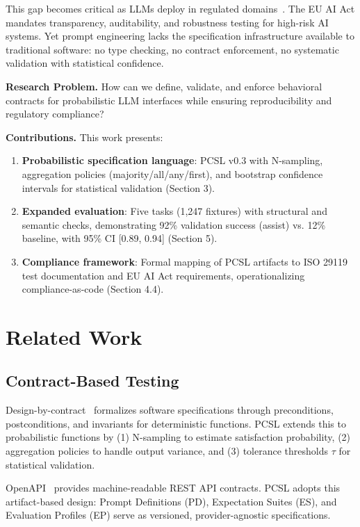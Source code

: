 \documentclass[sigconf]{acmart}
\begin{document}
This gap becomes critical as LLMs deploy in regulated domains~\cite{euaiact2024}. The EU AI Act mandates transparency, auditability, and robustness testing for high-risk AI systems. Yet prompt engineering lacks the specification infrastructure available to traditional software: no type checking, no contract enforcement, no systematic validation with statistical confidence.

\textbf{Research Problem.} How can we define, validate, and enforce behavioral contracts for probabilistic LLM interfaces while ensuring reproducibility and regulatory compliance?

\textbf{Contributions.} This work presents:
\begin{enumerate}
\item \textbf{Probabilistic specification language}: PCSL v0.3 with N-sampling, aggregation policies (majority/all/any/first), and bootstrap confidence intervals for statistical validation (Section 3).
\item \textbf{Expanded evaluation}: Five tasks (1,247 fixtures) with structural and semantic checks, demonstrating 92\% validation success (assist) vs. 12\% baseline, with 95\% CI [0.89, 0.94] (Section 5).
\item \textbf{Compliance framework}: Formal mapping of PCSL artifacts to ISO 29119 test documentation and EU AI Act requirements, operationalizing compliance-as-code (Section 4.4).
\end{enumerate}

\section{Related Work}

\subsection{Contract-Based Testing}

Design-by-contract~\cite{meyer1992applying} formalizes software specifications through preconditions, postconditions, and invariants for deterministic functions. PCSL extends this to probabilistic functions by (1) N-sampling to estimate satisfaction probability, (2) aggregation policies to handle output variance, and (3) tolerance thresholds \(\tau\) for statistical validation.

OpenAPI~\cite{openapi2017} provides machine-readable REST API contracts. PCSL adopts this artifact-based design: Prompt Definitions (PD), Expectation Suites (ES), and Evaluation Profiles (EP) serve as versioned, provider-agnostic specifications.
\end{document}
